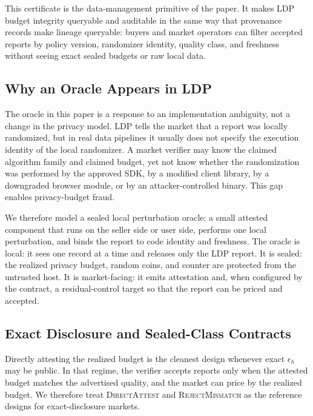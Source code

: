\documentclass[conference]{IEEEtran}
\newcommand{\eps}{\epsilon}
\newcommand{\DirectAttest}{\textsc{DirectAttest}}
\newcommand{\RejectMismatch}{\textsc{RejectMismatch}}
\begin{document}
This certificate is the data-management primitive of the paper. It makes LDP budget integrity queryable and auditable in the same way that provenance records make lineage queryable: buyers and market operators can filter accepted reports by policy version, randomizer identity, quality class, and freshness without seeing exact sealed budgets or raw local data.

\subsection{Why an Oracle Appears in LDP}
\label{subsec:oracle-origin}

The oracle in this paper is a response to an implementation ambiguity, not a change in the privacy model. LDP tells the market that a report was locally randomized, but in real data pipelines it usually does not specify the execution identity of the local randomizer. A market verifier may know the claimed algorithm family and claimed budget, yet not know whether the randomization was performed by the approved SDK, by a modified client library, by a downgraded browser module, or by an attacker-controlled binary. This gap enables privacy-budget fraud.

We therefore model a sealed local perturbation oracle: a small attested component that runs on the seller side or user side, performs one local perturbation, and binds the report to code identity and freshness. The oracle is local: it sees one record at a time and releases only the LDP report. It is sealed: the realized privacy budget, random coins, and counter are protected from the untrusted host. It is market-facing: it emits attestation and, when configured by the contract, a residual-control target so that the report can be priced and accepted.


\subsection{Exact Disclosure and Sealed-Class Contracts}
\label{subsec:direct-attest}

Directly attesting the realized budget is the cleanest design whenever exact $\eps_h$ may be public. In that regime, the verifier accepts reports only when the attested budget matches the advertised quality, and the market can price by the realized budget. We therefore treat \DirectAttest{} and \RejectMismatch{} as the reference designs for exact-disclosure markets.
\end{document}
